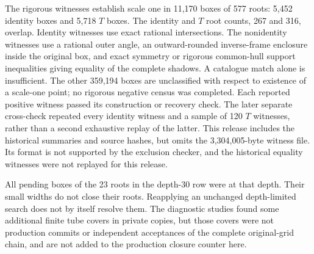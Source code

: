 The rigorous witnesses establish scale one in 11,170 boxes of 577 roots:
5,452 identity boxes and 5,718 $T$ boxes. The identity and $T$ root counts,
267 and 316, overlap. Identity witnesses use exact rational
intersections. The nonidentity witnesses use a rational outer angle,
an outward-rounded inverse-frame enclosure inside the original box,
and exact symmetry or rigorous common-hull support inequalities giving
equality of the complete shadows. A catalogue match alone is insufficient.
The other 359,194 boxes are unclassified with respect to existence of a
scale-one point; no rigorous negative census was completed. Each reported
positive witness passed its construction or recovery check. The later
separate cross-check repeated every identity witness and a sample of
120 $T$ witnesses, rather than a second exhaustive replay of the latter.
This release includes the historical summaries and source hashes, but
omits the 3,304,005-byte witness file. Its format is not supported by the
exclusion checker, and the historical equality witnesses were not
replayed for this release.

All pending boxes of the 23 roots in the depth-30 row were at that depth.
Their small widths do not close their roots. Reapplying an unchanged
depth-limited search does not by itself resolve them. The diagnostic
studies found some additional finite tube covers in private copies, but
those covers were not production commits or independent acceptances of
the complete original-grid chain, and are not added to the production
closure counter here.
